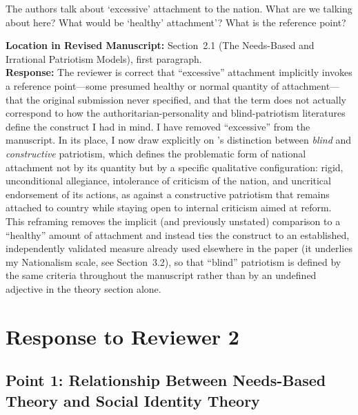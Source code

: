 \documentclass[11pt]{article}
\begin{document}
\begin{reviewercomment}
The authors talk about `excessive' attachment to the nation. What are we talking about here? What would be `healthy' attachment'? What is the reference point?
\end{reviewercomment}

\noindent\textbf{Location in Revised Manuscript:} Section~2.1 (The Needs-Based and Irrational Patriotism Models), first paragraph.\\[4pt]
\textbf{Response:} The reviewer is correct that ``excessive'' attachment implicitly invokes a reference point---some presumed healthy or normal quantity of attachment---that the original submission never specified, and that the term does not actually correspond to how the authoritarian-personality and blind-patriotism literatures define the construct I had in mind. I have removed ``excessive'' from the manuscript. In its place, I now draw explicitly on \citet{schatz1999varieties}'s distinction between \textit{blind} and \textit{constructive} patriotism, which defines the problematic form of national attachment not by its quantity but by a specific qualitative configuration: rigid, unconditional allegiance, intolerance of criticism of the nation, and uncritical endorsement of its actions, as against a constructive patriotism that remains attached to country while staying open to internal criticism aimed at reform. This reframing removes the implicit (and previously unstated) comparison to a ``healthy'' amount of attachment and instead ties the construct to an established, independently validated measure already used elsewhere in the paper (it underlies my Nationalism scale, see Section~3.2), so that ``blind'' patriotism is defined by the same criteria throughout the manuscript rather than by an undefined adjective in the theory section alone.

\clearpage

\section*{Response to Reviewer 2}

\subsection*{Point 1: Relationship Between Needs-Based Theory and Social Identity Theory}
\end{document}
